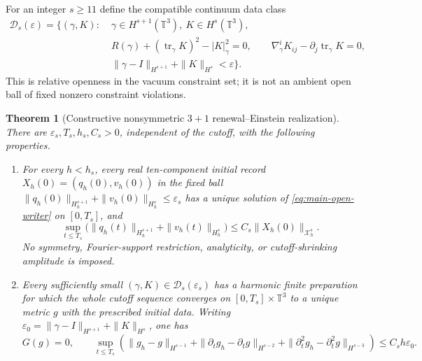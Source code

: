 \documentclass[11pt]{article}
\newtheorem{theorem}{Theorem}[section]
\numberwithin{equation}{section}
\theoremstyle{definition}
\theoremstyle{remark}
\newcommand{\tr}{\operatorname{tr}}
\begin{document}
For an integer $s\ge11$ define the compatible continuum data class
\begin{equation}
 \begin{split}
 \mathcal D_s(\varepsilon)=\bigl\{(\gamma,K):\;&
 \gamma\in H^{s+1}(\mathbb T^3),\ K\in H^s(\mathbb T^3),\\
 &R(\gamma)+(\tr_\gamma K)^2-|K|_\gamma^2=0,\qquad
 \nabla_\gamma^iK_{ij}-\partial_j\tr_\gamma K=0,\\
 &\|\gamma-I\|_{H^{s+1}}+\|K\|_{H^s}<\varepsilon\bigr\}.
 \end{split}
 \label{eq:main-open-data-class}
\end{equation}
This is relative openness in the vacuum constraint set; it is not an ambient
open ball of fixed nonzero constraint violations.

\begin{theorem}[Constructive nonsymmetric $3+1$ renewal--Einstein realization]
\label{thm:main-open-3plus1}
There are $\varepsilon_s,T_s,h_s,C_s>0$, independent of the cutoff, with the
following properties.
\begin{enumerate}[label=\textup{(O\arabic*)},leftmargin=3em]
\item For every $h<h_s$, every real ten-component initial record
      $X_h(0)=(q_h(0),v_h(0))$ in the fixed ball
      $\|q_h(0)\|_{H_h^{s+1}}+\|v_h(0)\|_{H_h^s}\le\varepsilon_s$
      has a unique solution of \eqref{eq:main-open-writer} on $[0,T_s]$, and
      \begin{equation}
       \sup_{t\le T_s}
       \bigl(\|q_h(t)\|_{H_h^{s+1}}+\|v_h(t)\|_{H_h^s}\bigr)
       \le C_s\|X_h(0)\|_{\mathcal X_h^s}.
       \label{eq:main-open-uniform-time}
      \end{equation}
      No symmetry, Fourier-support restriction, analyticity, or
      cutoff-shrinking amplitude is imposed.
\item Every sufficiently small $(\gamma,K)\in\mathcal D_s(\varepsilon_s)$
      has a harmonic finite preparation for which the whole cutoff sequence
      converges on $[0,T_s]\times\mathbb T^3$ to a unique metric $g$ with the
      prescribed initial data.  Writing
      $\varepsilon_0=\|\gamma-I\|_{H^{s+1}}+\|K\|_{H^s}$, one has
      \begin{equation}
       \boxed{G(g)=0,\qquad
       \sup_{t\le T_s}\left(
       \|g_h-g\|_{H^{s-1}}+\|\partial_tg_h-\partial_tg\|_{H^{s-2}}
       +\|\partial_t^2g_h-\partial_t^2g\|_{H^{s-3}}
       \right)\le C_sh\varepsilon_0.}
       \label{eq:main-open-einstein-rate}
      \end{equation}

\end{enumerate}
\end{theorem}
\end{document}
